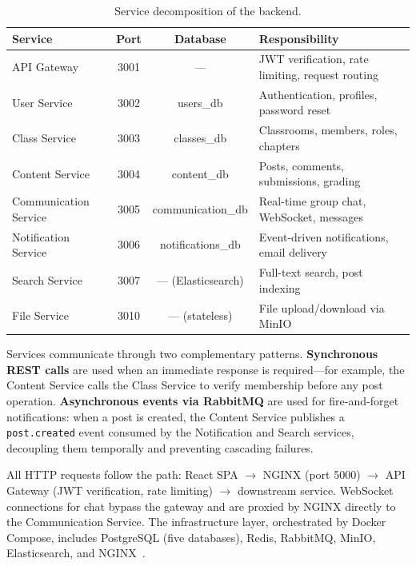 \begin{table}[H]
  \centering
  \caption{Service decomposition of the \eduspace{} backend.}
  \label{tab:services}
  \small
  \begin{tabularx}{\textwidth}{@{} l c c X @{}}
    \toprule
    \textbf{Service} & \textbf{Port} & \textbf{Database} & \textbf{Responsibility} \\
    \midrule
    API Gateway            & 3001 & ---               & JWT verification, rate limiting, request routing \\
    User Service           & 3002 & users\_db         & Authentication, profiles, password reset \\
    Class Service          & 3003 & classes\_db       & Classrooms, members, roles, chapters \\
    Content Service        & 3004 & content\_db       & Posts, comments, submissions, grading \\
    Communication Service  & 3005 & communication\_db & Real-time group chat, WebSocket, messages \\
    Notification Service   & 3006 & notifications\_db & Event-driven notifications, email delivery \\
    Search Service         & 3007 & --- (Elasticsearch) & Full-text search, post indexing \\
    File Service           & 3010 & --- (stateless)   & File upload/download via MinIO \\
    \bottomrule
  \end{tabularx}
\end{table}

Services communicate through two complementary patterns.
\textbf{Synchronous REST calls} are used when an immediate response is required---for example, the Content Service calls the Class Service to verify membership before any post operation.
\textbf{Asynchronous events via RabbitMQ} are used for fire-and-forget notifications: when a post is created, the Content Service publishes a \texttt{post.created} event consumed by the Notification and Search services, decoupling them temporally and preventing cascading failures.

All HTTP requests follow the path: React SPA $\rightarrow$ NGINX (port 5000) $\rightarrow$ API Gateway (JWT verification, rate limiting) $\rightarrow$ downstream service.
WebSocket connections for chat bypass the gateway and are proxied by NGINX directly to the Communication Service.
The infrastructure layer, orchestrated by Docker Compose, includes PostgreSQL (five databases), Redis, RabbitMQ, MinIO, Elasticsearch, and NGINX~\cite{postgresql2024docs,redis2024docs,rabbitmq2024docs,minio2024docs,elasticsearch2024docs,nginx2024docs}.

